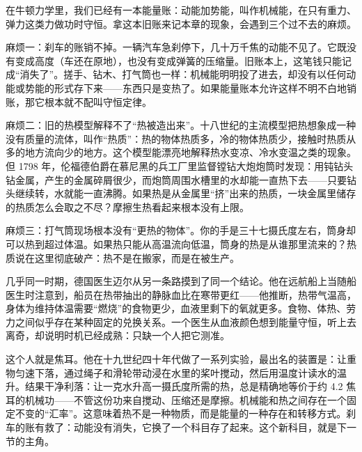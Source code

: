 \begin{mainline}
在牛顿力学里，我们已经有一本能量账：动能加势能，叫作机械能，在只有重力、弹力这类力做功时守恒。拿这本旧账来记本章的现象，会遇到三个过不去的麻烦。

麻烦一：刹车的账销不掉。一辆汽车急刹停下，几十万千焦的动能不见了。它既没有变成高度（车还在原地），也没有变成弹簧的压缩量。旧账本上，这笔钱只能记成“消失了”。搓手、钻木、打气筒也一样：机械能明明投了进去，却没有以任何动能或势能的形式存下来——东西只是变热了。如果能量账本允许这样不明不白地销账，那它根本就不配叫守恒定律。

麻烦二：旧的热模型解释不了“热被造出来”。十八世纪的主流模型把热想象成一种没有质量的流体，叫作“热质”：热的物体热质多，冷的物体热质少，接触时热质从多的地方流向少的地方。这个模型能漂亮地解释热水变凉、冷水变温之类的现象。但 1798 年，伦福德伯爵在慕尼黑的兵工厂里监督镗钻大炮炮筒时发现：用钝钻头钻金属，产生的金属碎屑很少，而炮筒周围水槽里的水却能一直热下去——只要钻头继续转，水就能一直沸腾。如果热是从金属里“挤”出来的热质，一块金属里储存的热质怎么会取之不尽？摩擦生热看起来根本没有上限。

麻烦三：打气筒现场根本没有“更热的物体”。你的手是三十七摄氏度左右，筒身却可以热到超过体温。如果热只能从高温流向低温，筒身的热是从谁那里流来的？热质说在这里彻底破产：热不是在搬家，而是在被生产。

几乎同一时期，德国医生迈尔从另一条路摸到了同一个结论。他在远航船上当随船医生时注意到，船员在热带抽出的静脉血比在寒带更红——他推断，热带气温高，身体为维持体温需要“燃烧”的食物更少，血液里剩下的氧就更多。食物、体热、劳力之间似乎存在某种固定的兑换关系。一个医生从血液颜色想到能量守恒，听上去离奇，却说明时机已经成熟：只缺一个人把它测准。

这个人就是焦耳。他在十九世纪四十年代做了一系列实验，最出名的装置是：让重物匀速下落，通过绳子和滑轮带动浸在水里的桨叶搅动，然后用温度计读水的温升。结果干净利落：让一克水升高一摄氏度所需的热，总是精确地等价于约 4.2 焦耳的机械功——不管这份功来自搅动、压缩还是摩擦。机械能和热之间存在一个固定不变的“汇率”。这意味着热不是一种物质，而是能量的一种存在和转移方式。刹车的账有救了：动能没有消失，它换了一个科目存了起来。这个新科目，就是下一节的主角。
\end{mainline}


